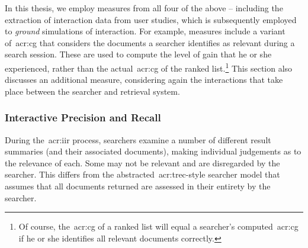 In this thesis, we employ measures from all four of the above -- including the extraction of interaction data from user studies, which is subsequently employed to \emph{ground} simulations of interaction. For example, measures include a variant of~\gls{acr:cg} that considers the documents a searcher identifies as relevant during a search session. These are used to compute the level of gain that he or she experienced, rather than the actual~\gls{acr:cg} of the ranked list.\footnote{Of course, the~\gls{acr:cg} of a ranked list will equal a searcher's computed~\gls{acr:cg} if he or she identifies all relevant documents correctly.} This section also discusses an additional measure, considering again the interactions that take place between the searcher and retrieval system.

%
%

\subsubsection{Interactive Precision and Recall}\label{sec:ir_background:evaluation:user:ipr}
During the~\gls{acr:iir} process, searchers examine a number of different result summaries (and their associated documents), making individual judgements as to the relevance of each. Some may not be relevant and are disregarded by the searcher. This differs from the abstracted~\gls{acr:trec}-style searcher model that assumes that all documents returned are assessed in their entirety by the searcher.

